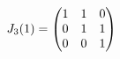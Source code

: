 \documentclass[preview]{standalone}
\begin{document}
\begin{align*}
\special{dvisvgm:raw <g id='unique000'>}J_3(1)=\begin{pmatrix}1&1&0\\0&1&1\\0&0&1\end{pmatrix}\special{dvisvgm:raw </g>}
\end{align*}
\end{document}
